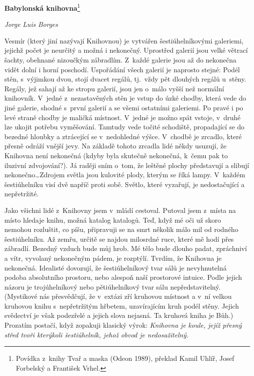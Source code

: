 \documentclass[11pt]{article}
\begin{document}
\noindent
\Huge
\textbf{Babylonská knihovna}\footnote{Povídka z~knihy Tvař a maska (Odeon 1989), překlad Kamil Uhlíř, Josef Forbelský a František Vrhel.}

\Large\noindent
\textit{Jorge Luis Borges}
\bigskip

\normalsize
Vesmír (který jiní nazývají Knihovnou) je vytvářen šestiúhelníkovými galeriemi, jejichž počet je neurčitý a možná i nekonečný. Uprostřed galerií jsou velké větrací šachty, obehnané nizoučkým zábradlím. Z~každé galerie jsou až do nekonečna vidět dolní i horní poschodí. Uspořádání všech galerií je naprosto stejné: Podél stěn, s~výjimkou dvou, stojí dvacet regálů, tj.\ vždy pět dlouhých regálů u~stěny. Regály, jež sahají až ke stropu galerií, jsou jen o~málo vyšší než normální knihovník. V~jedné z~nezastavěných stěn je vstup do úzké chodby, která vede do jiné galerie, shodné s~první galerií a se všemi ostatními galeriemi. Po pravé i po levé straně chodby je maličká místnost. V~jedné je možno spát vstoje, v~druhé lze ukojit potřebu vyměšování. Tamtudy vede točité schodiště, propadající se do bezedné hloubky a ztrácející se v~nedohledné výšce. V~chodbě je zrcadlo, které přesně odráží vnější jevy. Na základě tohoto zrcadla lidé někdy usuzují, že Knihovna není nekonečná (kdyby byla skutečně nekonečná, k~čemu pak to iluzivní zdvojování?). Já raději sním o~tom, že leštěné plochy představují a slibují nekonečno\dots Zdrojem světla jsou kulovité plody, kterým se říká lampy. V~každém šestiúhelníku visí dvě napříč proti sobě. Světlo, které vyzařují, je nedostačující a nepřetržité.

Jako všichni lidé z~Knihovny jsem v~mládí cestoval. Putoval jsem z~místa na místo hledaje knihu, možná katalog katalogů. Teď, když mé oči už skoro nemohou rozluštit, co píšu, připravuji se na smrt několik málo mil od rodného šestiúhelníku. Až zemřu, určitě se najdou milosrdné ruce, které mě hodí přes zábradlí. Bezedný vzduch bude můj hrob. Mé tělo bude dlouho padat, zpráchniví a vítr, vyvolaný nekonečným pádem, je rozptýlí. Tvrdím, že Knihovna je nekonečná. Idealisté dovozují, že šestiúhelníkový tvar sálů je nevyhnutelná podoba absolutního prostoru, nebo alespoň naší prostorové intuice. Podle jejich názoru je trojúhelníkový nebo pětiúhelníkový tvar sálu nepředstavitelný. (Mystikové nás přesvědčují, že v~extázi zří kruhovou místnost a v~ní velkou kruhovou knihu s~nepřetržitým hřbetem, uzavírajícím kruh podél stěny. Jejich svědectví je však podezřelé a jejich slova nejasná. Ta kruhová kniha je Bůh.) Prozatím postačí, když zopakuji klasický výrok: \textit{Knihovna je koule, jejíž přesný střed tvoři kterýkoli šestiúhelník, jehož obvod je nedosažitelný.}
\end{document}
